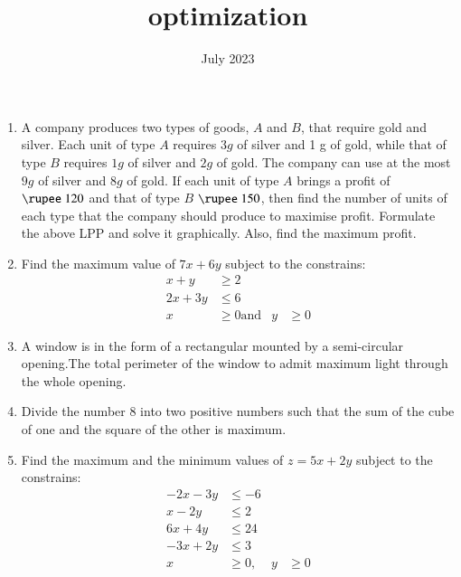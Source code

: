 \documentclass{article}
\begin{document}
\begin{center}
\title{optimization}
\date{July 2023}
\maketitle     
\end{center}
\begin{enumerate}
  
\item A company produces two types of goods, $A$ and $B$, that require gold and
silver. Each unit of type $A$ requires $3g$ of silver and 1 g of gold, while that
of type $B$ requires $1g$ of silver and $2g$ of gold. The company can use at
the most $9g$ of silver and $8g$ of gold. If each unit of type $A$ brings a profit
of $\rupee~120$ and that of type $B$ $\rupee~150$, then find the number of units of each type that the company should produce to maximise profit. Formulate the above LPP and solve it graphically. Also, find the maximum profit.
\item Find the maximum value of $7x+6y$ subject to the constrains:
\begin{align}
	x+y &\geq   2\\
	2x+3y &\leq 6\\
	x &\geq 0 \text{and} &y &\geq 0
\end{align}
\item A window is in the form of a rectangular mounted by a semi-circular opening.The total perimeter of the window to admit maximum light through the whole opening.
\item Divide the number $8$ into two positive numbers such that the sum of the cube of one and the square of the other is maximum.
\item Find the maximum and the minimum values of $z=5x+2y$ subject to the constrains:
\begin{align}
	-2x-3y &\leq -6\\
	x-2y &\leq 2\\
	6x+4y &\leq 24\\
	-3x+2y &\leq 3\\
	x &\geq 0, &y& \geq 0
\end{align}
 

\end{enumerate}
\end{document}
